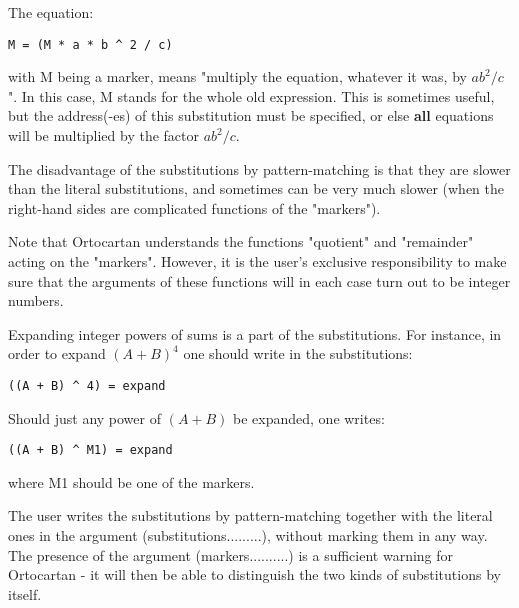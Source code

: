 The equation:

\bigskip

\begin{verbatim}
M = (M * a * b ^ 2 / c)
\end{verbatim}

\bigskip

\noindent with M being a marker, means "multiply the equation, whatever it was,
by $ab^2/c$". In this case, M stands for the whole old expression. This is
sometimes useful, but the address(-es) of this substitution must be specified,
or else {\bf all} equations will be multiplied by the factor $ab^2/c$.

The disadvantage of the substitutions by pattern-matching is that they are
slower than the literal  substitutions,
     and  sometimes  can be very much slower (when the right-hand
     sides are complicated functions of the "markers").

Note that Ortocartan understands the functions "quotient"
     and "remainder" acting on the  "markers".  However,  it  is  the
     user's  exclusive  responsibility  to  make  sure  that  the
     arguments of these functions will in each case turn  out  to
     be integer numbers.

Expanding integer powers of sums is a part of the substitutions. For instance,
in order to expand $(A + B)^4$ one  should
     write in the substitutions:

\bigskip

\begin{verbatim}
((A + B) ^ 4) = expand
\end{verbatim}

\bigskip

\noindent Should just any power of $(A + B)$ be expanded, one writes:

\bigskip

\begin{verbatim}
((A + B) ^ M1) = expand
\end{verbatim}

\bigskip

\noindent where M1 should be one of the markers.

The user writes the substitutions  by  pattern-matching together  with  the
literal ones in the argument (substitutions.........), without marking them in
any way. The  presence  of  the  argument  (markers..........) is a sufficient
     warning for Ortocartan - it will then be able to distinguish
     the two kinds of substitutions by itself.

